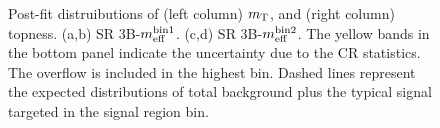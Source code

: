 \clearpage
\begin{figure}[h]
  \centering
    \caption{   
      Post-fit distruibutions of (left column) $m_{\mathrm{T}}$, and (right column) topness.
      (a,b) SR 3B-$m_{\mathrm{eff}}^{\mathrm{bin 1}}$.
      (c,d) SR 3B-$m_{\mathrm{eff}}^{\mathrm{bin 2}}$.
      The yellow bands in the bottom panel indicate the uncertainty due to the CR statistics. The overflow is included in the highest bin. Dashed lines represent the expected distributions of total background plus the typical signal targeted in the signal region bin.
      \label{fig::BGestimation::SRVRpostFit::SR3B}
    }
\end{figure}
